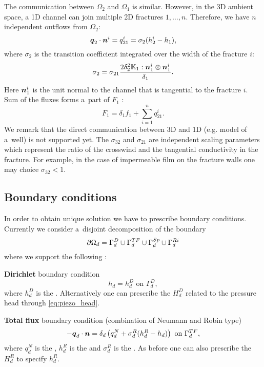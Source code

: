 The communication between $\Omega_2$  and  $\Omega_1$ is similar.  However, in the 3D ambient space,
a 1D channel can join multiple 2D fractures $1,\dots, n$. Therefore, we have $n$
independent outflows from $\Omega_2$:
\begin{equation*}
        \mathbf{\boldsymbol{q}}_2\cdot \mathbf{\boldsymbol{n}}^{i} = q_{21}^{i} =\sigma_{2} (h_2^{i}-h_1),
\end{equation*}
where $\sigma_2$  is the transition coefficient integrated over the width of the fracture $i$:
\[
\label{e:sigma2_law}
  \sigma_2 = \sigma_{21} \frac{2\delta_2^2\tn K_1:{\vc n_1^i}\otimes{\vc n_1^i}}{\delta_1}.
\]
Here $\mathbf{\boldsymbol{n}}_1^i$ is the unit normal to the channel that is tangential to the fracture $i$.
Sum of the fluxes forms a~part of $F_1$ :
\begin{equation}
   \label{source_1D}
   F_1 = \delta_1 f_1 + \sum_{i=1}^n q_{21}^{i}. 
\end{equation}
We remark that the direct communication between 3D and 1D (e.g. model of a~well) is not supported yet.
The  
{$\sigma_{32}$} \units{}{}{} and
{$\sigma_{21}$} \units{}{}{} are independent scaling parameters which represent 
the ratio of the crosswind and the tangential conductivity in the fracture. For example, in the case of impermeable film
on the fracture walls one may choice $\sigma_{32} < 1$.

\subsection{Boundary conditions}
In order to obtain unique solution we have to prescribe boundary conditions.
Currently we consider a~disjoint decomposition of the boundary
\[
    \partial\Omega_d = \Gamma_d^D \cup \Gamma_d^{TF} \cup \Gamma_d^{Sp} \cup \Gamma_d^{Ri}
\]
where we support the following
:

{\bf Dirichlet} boundary condition
\[
    h_d = h_d^D        \text{ on }\Gamma_d^D,
\]
where $h_d^D$  is the  .
Alternatively one can prescribe the 
$H_d^D$  related to the pressure head through \eqref{eq:piezo_head}.

{\bf Total flux} boundary condition (combination of Neumann and Robin type)
\[
    -\mathbf{\boldsymbol{q}}_d \cdot \mathbf{\boldsymbol{n}} = \delta_d\left(q_d^N + \sigma_d^R ( h_d^R - h_d)\right)        \text{ on }\Gamma_d^{TF},
\]
where $q_d^N$  is the ,
$h_d^R$  is the  and
$\sigma_d^R$   
is the .
As before one can also prescribe the 
$H_d^R$ to specify $h_d^R$.

